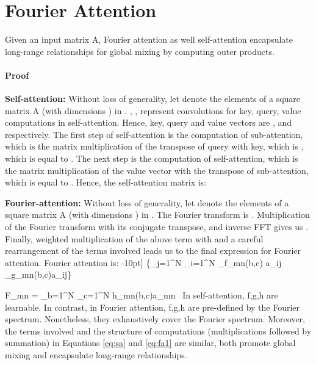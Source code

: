 \documentclass[runningheads]{llncs}
\begin{document}
\section{Fourier Attention}

\begin{lemma}
Given an input matrix A, Fourier attention as well self-attention \cite{vaswani2017attention,bertasius2021space} encapsulate long-range relationships for global mixing by computing outer products.
\end{lemma}
\paragraph{Proof}
\textbf{Self-attention:} Without loss of generality, let  denote the elements of a square matrix A (with dimensions ) in . , ,  represent  convolutions for key, query, value computations in self-attention. Hence, key, query and value vectors are ,  and  respectively. The first step of self-attention is the computation of sub-attention, which is the matrix multiplication of the transpose of query with key, which is , which is equal to . The next step is the computation of self-attention, which is the matrix multiplication of the value vector with the transpose of sub-attention, which is equal to . Hence, the self-attention matrix  is:

\textbf{Fourier-attention:} Without loss of generality, let  denote the elements of a square matrix A (with dimensions ) in . The Fourier transform is . Multiplication of the Fourier transform with its conjugate transpose, and inverse FFT gives us . Finally, weighted multiplication of the above term with  and a careful rearrangement of the terms involved leads us to the final expression for Fourier attention. Fourier attention  is:
-10pt] \{\sum_{j=1}^{N} \sum_{i=1}^{N} _{f_{mn}(b,c)} a_{ij} \times {}_{g_{mn}(b,c)}a_{ij}\}
    \label{eq:fa}

    F_{mn} = \sum_{b=1}^{N} \sum_{c=1}^{N} h_{mn}(b,c)a_{mn} \times \nonumber \
In self-attention, f,g,h are learnable. In contrast, in Fourier attention, f,g,h are pre-defined by the Fourier spectrum. Nonetheless, they exhaustively cover the Fourier spectrum. Moreover, the terms involved and the structure of computations (multiplications followed by summation) in Equations \ref{eq:sa} and \ref{eq:fa1} are similar, both promote global mixing and encapsulate long-range relationships. 
\end{document}
